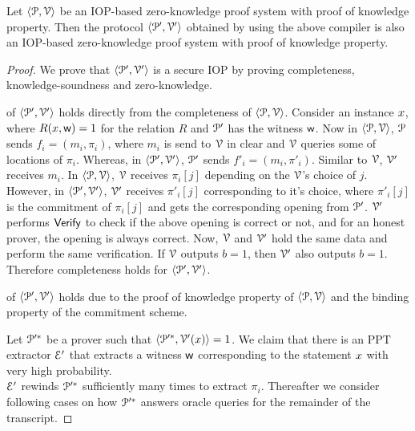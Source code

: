 \begin{lemma}\label{lemma:compiler}
	Let $\langle \mathcal{P},\mathcal{V}\rangle$ be an IOP-based zero-knowledge proof system with proof of knowledge property. Then the protocol $\langle \mathcal{P}',\mathcal{V}'\rangle$ obtained by using the above compiler is also an IOP-based zero-knowledge proof system with proof of knowledge property.
\end{lemma}
\begin{proof}
	We prove that $\langle \mathcal{P}',\mathcal{V}'\rangle$ is a secure IOP by proving completeness, knowledge-soundness and zero-knowledge.
	
	
	 of $\langle \mathcal{P}', \mathcal{V}' \rangle$ holds directly from the completeness of $\langle \mathcal{P}, \mathcal{V} \rangle$. 
	Consider an instance ${x}$, where $R({x},\mathsf{w}) = 1$ for the relation $R$ and $\mathcal{P}'$ has the witness $\mathsf{w}$. 
	Now in $\langle \mathcal{P},\mathcal{V}\rangle$, $\mathcal{P}$ sends $f_i = (m_i, \pi_i)$, where $m_i$ is send to $\mathcal{V}$ in clear and $\mathcal{V}$ queries some of locations of $\pi_i$. Whereas, in $\langle \mathcal{P}',\mathcal{V}'\rangle$, $\mathcal{P}'$ sends $f'_i = (m_i, \pi'_i)$. 
	Similar to $\mathcal{V}$, $\mathcal{V}'$ receives $m_i$. In $\langle \mathcal{P},\mathcal{V}\rangle$, $\mathcal{V}$ receives $\pi_i[j]$ depending on the $\mathcal{V}$'s choice of $j$. 
	However, in $\langle \mathcal{P}',\mathcal{V}'\rangle$, $\mathcal{V}'$ receives $\pi'_i[j]$ corresponding to it's choice, where $\pi'_i[j]$ is the commitment of $\pi_i[j]$ and gets the corresponding opening from $\mathcal{P}'$. 
	$\mathcal{V}'$ performs $\mathsf{Verify}$ to check if the above opening is correct or not, and for an honest prover, the opening is always correct.
	Now, $\mathcal{V}$ and $\mathcal{V}'$ hold the same data and perform the same verification. If $\mathcal{V}$ outputs $b = 1$, then $\mathcal{V}'$ also outputs $b = 1$. Therefore completeness holds for $\langle \mathcal{P}',\mathcal{V}'\rangle$.
	
	 of $\langle \mathcal{P}',\mathcal{V}'\rangle$ holds due to the proof of knowledge property of $\langle \mathcal{P},\mathcal{V}\rangle$ and the binding property of the commitment scheme.
	
	Let $\mathcal{P}'^\ast$ be a prover such that $\langle \mathcal{P}'^\ast,\mathcal{V}'({x})\rangle = 1$. We claim that there is an PPT extractor $\mathcal{E}'$ that extracts a witness $\mathsf{w}$ corresponding to the statement ${x}$ with very high probability.\\
	$\mathcal{E}'$ rewinds $\mathcal{P}'^\ast$ sufficiently many times to extract $\pi_i$. Thereafter we consider following cases on how $\mathcal{P}'^\ast$ answers oracle queries for the remainder of the transcript.	
	

\end{proof}
